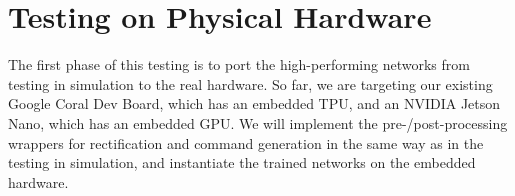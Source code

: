 \section{Testing on Physical Hardware}

The first phase of this testing is to port the high-performing networks from testing in simulation to the real hardware.
So far, we are targeting our existing Google Coral Dev Board, which has an embedded TPU,
and an NVIDIA Jetson Nano, which has an embedded GPU.
We will implement the pre-/post-processing wrappers for rectification and command generation in the same way as in the testing in simulation,
and instantiate the trained networks on the embedded hardware.